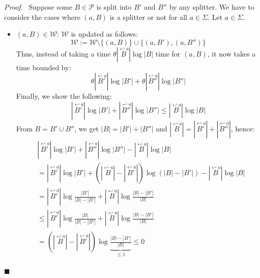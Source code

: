 \documentclass[12pt, a4 paper]{article}
\renewenvironment{proof}[1][Proof]{\begin{mdframed}[backgroundcolor=black!5, topline=false, rightline=false, bottomline=false, linecolor=black!15, linewidth=3pt]{\noindent\textit{#1.}\ }}{\noindent\par\hfill$\blacksquare$\end{mdframed}}
\theoremstyle{definition}
\begin{document}
\begin{proof}
    Suppose some $B \in \mathcal{P}$ is split into $B'$ and $B''$ by any splitter.
    We have to consider the cases where $(a , B)$ is a splitter or not for all $a \in \Sigma$.
    Let $a \in \Sigma$.
    \begin{itemize}
        \item $(a, B) \in \mathcal{W}$: $\mathcal{W}$ is updated as follows:
        $$ \mathcal{W} := \mathcal{W} \setminus \{(a, B)\} \cup \{(a, B'), (a, B'')\}$$
        Thus, instead of taking a time $\theta | \overset{\hookleftarrow a}{B} | \log | B |$ time for $(a, B)$, it now takes a time bounded by:
        $$\theta | \overset{\hookleftarrow a}{B'} | \log | B' | + \theta | \overset{\hookleftarrow a}{B''} | \log | B'' |$$
        Finally, we show the following:
        \begin{equation*}
            | \overset{\hookleftarrow a}{B'} | \log | B' | + | \overset{\hookleftarrow a}{B''} | \log | B'' | \leq | \overset{\hookleftarrow a}{B} | \log | B |
        \end{equation*}
        From $B = B' \cup B''$, we get $|B| = |B'| + |B''|$ and $| \overset{\hookleftarrow a}{B} | = | \overset{\hookleftarrow a}{B'} | + | \overset{\hookleftarrow a}{B''} |$, hence:
        \begin{align*}
            & |\overset{\hookleftarrow a}{B'} | \log | B' | + | \overset{\hookleftarrow a}{B''} | \log | B'' | - | \overset{\hookleftarrow a}{B} | \log | B | \\
            &= | \overset{\hookleftarrow a}{B'} | \log | B' | + (| \overset{\hookleftarrow a}{B} | - | \overset{\hookleftarrow a}{B'}|) \log \left(|B|-|B'|\right) - | \overset{\hookleftarrow a}{B} | \log | B | \\
            &= | \overset{\hookleftarrow a}{B'} | \log \frac{|B'|}{|B|-|B'|} + | \overset{\hookleftarrow a}{B} | \log \frac{|B|-|B'|}{|B|} \\
            &\leq | \overset{\hookleftarrow a}{B'} | \log \frac{|B|}{|B|-|B'|} + | \overset{\hookleftarrow a}{B} | \log \frac{|B|-|B'|}{|B|} \\
            &= (| \overset{\hookleftarrow a}{B}| - |\overset{\hookleftarrow a}{B'} |) \log \underset{\leq 1}{\underbrace{\frac{|B|-|B'|}{|B|}}} \leq 0
        \end{align*}


\end{itemize}
\end{proof}
\end{document}
